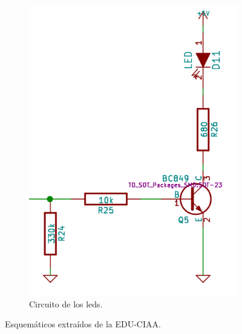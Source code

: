 \begin{figure}[!hp]
\begin{subfigure}{0.4\textwidth}
    \includegraphics[width=1\linewidth]{./Figures/led_sch.png}
    \caption{Circuito de los leds.}
  \end{subfigure}
  \caption{Esquemáticos extraídos de la EDU-CIAA.}
  \label{fig:pul_leda_pulses}
\end{figure}


